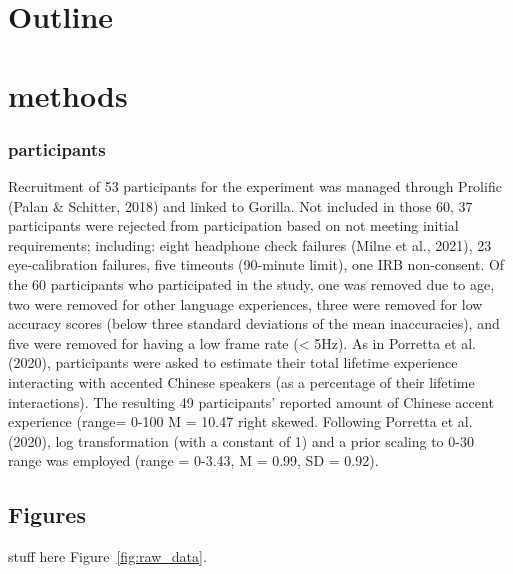 \documentclass[a4paper]{article}
\begin{document}
\section{Outline}


\section{methods}

\subsubsection{participants}

Recruitment of 53 participants for the experiment was
managed through Prolific (Palan & Schitter, 2018) and linked to Gorilla. Not included
in those 60, 37 participants were rejected from participation based on not meeting
initial requirements; including: eight headphone check failures (Milne et al., 2021), 23
eye-calibration failures, five timeouts (90-minute limit), one IRB non-consent. Of the 60
participants who participated in the study, one was removed due to age, two were
removed for other language experiences, three were removed for low accuracy scores
(below three standard deviations of the mean inaccuracies), and five were removed for
having a low frame rate (< 5Hz). As in Porretta et al. (2020), participants were asked
to estimate their total lifetime experience interacting with accented Chinese speakers
(as a percentage of their lifetime interactions). The resulting 49 participants’ reported
amount of Chinese accent experience (range= 0-100 M = 10.47%
right skewed. Following Porretta et al. (2020), log transformation (with a constant of 1)
and a prior scaling to 0-30 range was employed (range = 0-3.43, M = 0.99, SD = 0.92).

\subsection{Figures}

stuff here Figure~\ref{fig:raw_data}.
\end{document}
